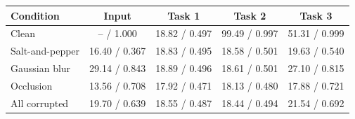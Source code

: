 \begin{tabular}{lcccc}
\toprule
Condition & Input & Task 1 & Task 2 & Task 3 \\
\midrule
Clean & -- / 1.000 & 18.82 / 0.497 & 99.49 / 0.997 & 51.31 / 0.999 \\
Salt-and-pepper & 16.40 / 0.367 & 18.83 / 0.495 & 18.58 / 0.501 & 19.63 / 0.540 \\
Gaussian blur & 29.14 / 0.843 & 18.89 / 0.496 & 18.61 / 0.501 & 27.10 / 0.815 \\
Occlusion & 13.56 / 0.708 & 17.92 / 0.471 & 18.13 / 0.480 & 17.88 / 0.721 \\
All corrupted & 19.70 / 0.639 & 18.55 / 0.487 & 18.44 / 0.494 & 21.54 / 0.692 \\
\bottomrule
\end{tabular}
